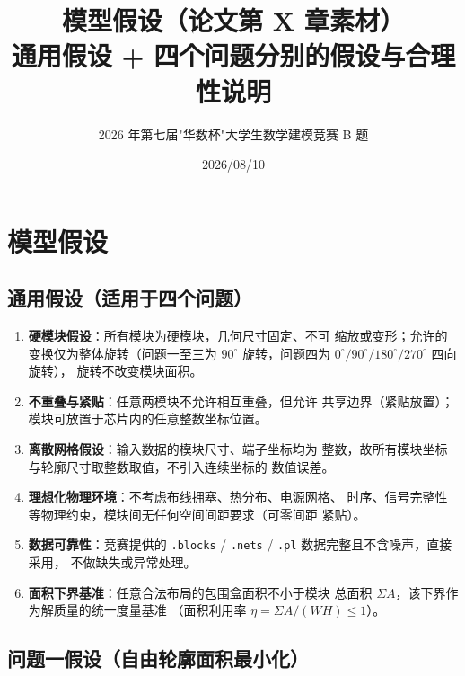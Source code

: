 \documentclass[12pt,a4paper]{article}
\title{\textbf{模型假设（论文第 X 章素材）}\\[6pt]
\large 通用假设 + 四个问题分别的假设与合理性说明}
\author{2026 年第七届"华数杯"大学生数学建模竞赛 B 题}
\date{2026/08/10}
\begin{document}
\maketitle

\section{模型假设}

\subsection{通用假设（适用于四个问题）}

\begin{enumerate}[leftmargin=2em]
    \item \textbf{硬模块假设}：所有模块为硬模块，几何尺寸固定、不可
    缩放或变形；允许的变换仅为整体旋转（问题一至三为 $90^\circ$
    旋转，问题四为 $0^\circ/90^\circ/180^\circ/270^\circ$ 四向旋转），
    旋转不改变模块面积。

    \item \textbf{不重叠与紧贴}：任意两模块不允许相互重叠，但允许
    共享边界（紧贴放置）；模块可放置于芯片内的任意整数坐标位置。

    \item \textbf{离散网格假设}：输入数据的模块尺寸、端子坐标均为
    整数，故所有模块坐标与轮廓尺寸取整数取值，不引入连续坐标的
    数值误差。

    \item \textbf{理想化物理环境}：不考虑布线拥塞、热分布、电源网格、
    时序、信号完整性等物理约束，模块间无任何空间间距要求（可零间距
    紧贴）。

    \item \textbf{数据可靠性}：竞赛提供的 \texttt{.blocks} /
    \texttt{.nets} / \texttt{.pl} 数据完整且不含噪声，直接采用，
    不做缺失或异常处理。

    \item \textbf{面积下界基准}：任意合法布局的包围盒面积不小于模块
    总面积 $\Sigma A$，该下界作为解质量的统一度量基准
    （面积利用率 $\eta = \Sigma A / (WH) \le 1$）。
\end{enumerate}

\subsection{问题一假设（自由轮廓面积最小化）}
\end{document}
